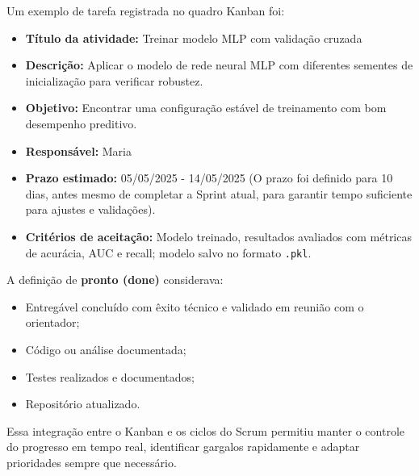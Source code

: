 Um exemplo de tarefa registrada no quadro Kanban foi:
\begin{itemize}
    \item \textbf{Título da atividade:} Treinar modelo MLP com validação cruzada
    \item \textbf{Descrição:} Aplicar o modelo de rede neural MLP com diferentes sementes de inicialização para verificar robustez.
    \item \textbf{Objetivo:} Encontrar uma configuração estável de treinamento com bom desempenho preditivo.
    \item \textbf{Responsável:} Maria
    \item \textbf{Prazo estimado:} 05/05/2025 - 14/05/2025 (O prazo foi definido para 10 dias, antes mesmo de completar a Sprint atual, para garantir tempo suficiente para ajustes e validações).
    \item \textbf{Critérios de aceitação:} Modelo treinado, resultados avaliados com métricas de acurácia, AUC e recall; modelo salvo no formato \texttt{.pkl}.
\end{itemize}

A definição de \textbf{pronto (done)} considerava:
\begin{itemize}
    \item Entregável concluído com êxito técnico e validado em reunião com o orientador;
    \item Código ou análise documentada;
    \item Testes realizados e documentados;
    \item Repositório atualizado.
\end{itemize}

Essa integração entre o Kanban e os ciclos do Scrum permitiu manter o controle do progresso em tempo real, identificar gargalos rapidamente e adaptar prioridades sempre que necessário.
